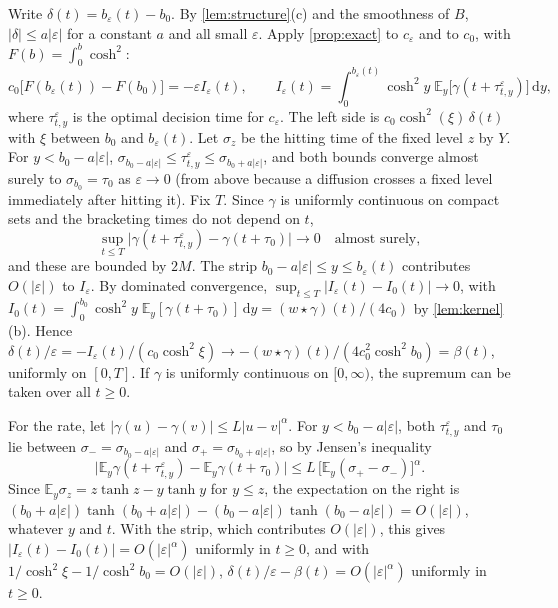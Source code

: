 \documentclass[11pt]{article}
\theoremstyle{definition}
\theoremstyle{remark}
\newcommand{\E}{\mathbb{E}}
\newcommand{\dd}{\,\mathrm{d}}
\begin{document}
Write $\delta(t) = b_\varepsilon(t) - b_0$. By \cref{lem:structure}(c) and the smoothness of $B$,
$|\delta| \le a|\varepsilon|$ for a constant $a$ and all small $\varepsilon$. Apply
\cref{prop:exact} to $c_\varepsilon$ and to $c_0$, with $F(b) = \int_0^b \cosh^2$:
\begin{equation}
  c_0\bigl[F(b_\varepsilon(t)) - F(b_0)\bigr] = -\varepsilon I_\varepsilon(t), \qquad
  I_\varepsilon(t) = \int_0^{b_\varepsilon(t)}\cosh^2 y\;\E_y\bigl[\gamma(t + \tau^\varepsilon_{t,y})\bigr]\dd y,
\end{equation}
where $\tau^\varepsilon_{t,y}$ is the optimal decision time for $c_\varepsilon$. The left side is
$c_0\cosh^2(\xi)\,\delta(t)$ with $\xi$ between $b_0$ and $b_\varepsilon(t)$. Let $\sigma_z$ be the
hitting time of the fixed level $z$ by $Y$. For $y < b_0 - a|\varepsilon|$,
$\sigma_{b_0 - a|\varepsilon|} \le \tau^\varepsilon_{t,y} \le \sigma_{b_0 + a|\varepsilon|}$, and
both bounds converge almost surely to $\sigma_{b_0} = \tau_0$ as $\varepsilon \to 0$ (from above
because a diffusion crosses a fixed level immediately after hitting it). Fix $T$. Since $\gamma$ is
uniformly continuous on compact sets and the bracketing times do not depend on $t$,
\begin{equation}
  \sup_{t \le T}\bigl|\gamma(t + \tau^\varepsilon_{t,y}) - \gamma(t + \tau_0)\bigr| \to 0
  \quad\text{almost surely},
\end{equation}
and these are bounded by $2M$. The strip $b_0 - a|\varepsilon| \le y \le b_\varepsilon(t)$
contributes $O(|\varepsilon|)$ to $I_\varepsilon$. By dominated convergence,
$\sup_{t \le T}|I_\varepsilon(t) - I_0(t)| \to 0$, with
$I_0(t) = \int_0^{b_0}\cosh^2 y\;\E_y[\gamma(t + \tau_0)]\dd y = (w \star \gamma)(t)/(4c_0)$ by
\cref{lem:kernel}(b). Hence
$\delta(t)/\varepsilon = -I_\varepsilon(t)/(c_0\cosh^2\xi) \to
-(w \star \gamma)(t)/(4c_0^2\cosh^2 b_0) = \beta(t)$, uniformly on $[0, T]$. If $\gamma$ is
uniformly continuous on $[0, \infty)$, the supremum can be taken over all $t \ge 0$.

For the rate, let $|\gamma(u) - \gamma(v)| \le L|u - v|^\alpha$. For $y < b_0 - a|\varepsilon|$,
both $\tau^\varepsilon_{t,y}$ and $\tau_0$ lie between $\sigma_- = \sigma_{b_0 - a|\varepsilon|}$
and $\sigma_+ = \sigma_{b_0 + a|\varepsilon|}$, so by Jensen's inequality
\begin{equation}
  \bigl|\E_y\gamma(t + \tau^\varepsilon_{t,y}) - \E_y\gamma(t + \tau_0)\bigr|
  \le L\,\bigl[\E_y(\sigma_+ - \sigma_-)\bigr]^\alpha .
\end{equation}
Since $\E_y\sigma_z = z\tanh z - y\tanh y$ for $y \le z$, the expectation on the right is
$(b_0 + a|\varepsilon|)\tanh(b_0 + a|\varepsilon|) - (b_0 - a|\varepsilon|)\tanh(b_0 - a|\varepsilon|)
= O(|\varepsilon|)$, whatever $y$ and $t$. With the strip, which contributes $O(|\varepsilon|)$, this
gives $|I_\varepsilon(t) - I_0(t)| = O(|\varepsilon|^\alpha)$ uniformly in $t \ge 0$, and with
$1/\cosh^2\xi - 1/\cosh^2 b_0 = O(|\varepsilon|)$, $\delta(t)/\varepsilon - \beta(t) =
O(|\varepsilon|^\alpha)$ uniformly in $t \ge 0$.
\end{document}
